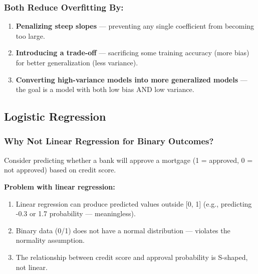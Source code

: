 \documentclass[12pt,openany]{book}
\begin{document}
\subsubsection{Both Reduce Overfitting By:}


\begin{enumerate}[leftmargin=*]
    \item \textbf{Penalizing steep slopes} --- preventing any single coefficient from becoming too large.
    \item \textbf{Introducing a trade-off} --- sacrificing some training accuracy (more bias) for better generalization (less variance).
    \item \textbf{Converting high-variance models into more generalized models} --- the goal is a model with both low bias AND low variance.

\end{enumerate}

\medskip


\subsection{Logistic Regression}


\subsubsection{Why Not Linear Regression for Binary Outcomes?}


Consider predicting whether a bank will approve a mortgage (1 = approved, 0 = not approved) based on credit score.

\textbf{Problem with linear regression:}
\begin{enumerate}[leftmargin=*]
    \item Linear regression can produce predicted values outside [0, 1] (e.g., predicting -0.3 or 1.7 probability --- meaningless).
    \item Binary data (0/1) does not have a normal distribution --- violates the normality assumption.
    \item The relationship between credit score and approval probability is S-shaped, not linear.

\end{enumerate}
\end{document}
